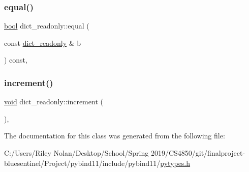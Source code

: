 \mbox{\label{classdict__readonly_a5190cd6607fe555c164fcc104903d11c}} 
\subsubsection{\texorpdfstring{equal()}{equal()}}
{\footnotesize\ttfamily \mbox{\hyperlink{asdl_8h_af6a258d8f3ee5206d682d799316314b1}{bool}} dict\+\_\+readonly\+::equal (\begin{DoxyParamCaption}\item[{const \mbox{\hyperlink{classdict__readonly}{dict\+\_\+readonly}} \&}]{b }\end{DoxyParamCaption}) const\hspace{0.3cm}{\ttfamily [inline]}, {\ttfamily [protected]}}

\mbox{\label{classdict__readonly_aed97e06f8d73b62e2af0d9034d0459cb}} 
\subsubsection{\texorpdfstring{increment()}{increment()}}
{\footnotesize\ttfamily \mbox{\hyperlink{_s_d_l__opengles2__gl2ext_8h_ae5d8fa23ad07c48bb609509eae494c95}{void}} dict\+\_\+readonly\+::increment (\begin{DoxyParamCaption}{ }\end{DoxyParamCaption})\hspace{0.3cm}{\ttfamily [inline]}, {\ttfamily [protected]}}



The documentation for this class was generated from the following file\+:\begin{DoxyCompactItemize}
\item 
C\+:/\+Users/\+Riley Nolan/\+Desktop/\+School/\+Spring 2019/\+C\+S4850/git/finalproject-\/bluesentinel/\+Project/pybind11/include/pybind11/\mbox{\hyperlink{pytypes_8h}{pytypes.\+h}}\end{DoxyCompactItemize}
